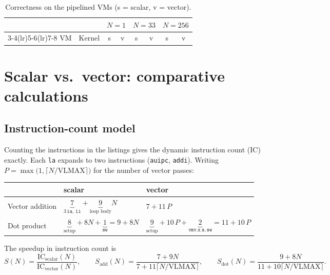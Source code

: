 \documentclass[11pt,a4paper]{article}
\newcommand{\code}[1]{\texttt{#1}}
\begin{document}
\begin{table}[H]
\centering\small
\caption{Correctness on the pipelined VMs (s = scalar, v = vector).}
\label{tab:pipe}
\begin{tabular}{llcccccc}
\toprule
& & \multicolumn{2}{c}{$N=1$} & \multicolumn{2}{c}{$N=33$} & \multicolumn{2}{c}{$N=256$} \\
\cmidrule(lr){3-4}\cmidrule(lr){5-6}\cmidrule(lr){7-8}
VM & Kernel & s & v & s & v & s & v \\
\midrule

\bottomrule
\end{tabular}
\end{table}

\section{Scalar vs.\ vector: comparative calculations}\label{sec:model}

\subsection{Instruction-count model}

Counting the instructions in the listings gives the dynamic instruction count (IC) exactly. Each
\code{la} expands to two instructions (\code{auipc}, \code{addi}). Writing
$P = \max\!\big(1, \lceil N/\mathrm{VLMAX} \rceil\big)$ for the number of vector passes:

\begin{center}
\begin{tabular}{lll}
\toprule
& scalar & vector \\
\midrule
Vector addition &
  $\underbrace{7}_{3\,\texttt{la},\ \texttt{li}} + \underbrace{9}_{\text{loop body}} N$ &
  $7 + 11\,P$ \\[10pt]
Dot product &
  $\underbrace{8}_{\text{setup}} + 8N + \underbrace{1}_{\texttt{sw}} = 9 + 8N$ &
  $\underbrace{9}_{\text{setup}} + 10\,P + \underbrace{2}_{\texttt{vmv.x.s},\,\texttt{sw}} = 11 + 10\,P$ \\
\bottomrule
\end{tabular}
\end{center}

The speedup in instruction count is
\[
  S(N) = \frac{\mathrm{IC}_{\text{scalar}}(N)}{\mathrm{IC}_{\text{vector}}(N)},
  \qquad
  S_{\text{add}}(N) = \frac{7 + 9N}{7 + 11\lceil N/\mathrm{VLMAX}\rceil},
  \qquad
  S_{\text{dot}}(N) = \frac{9 + 8N}{11 + 10\lceil N/\mathrm{VLMAX}\rceil}.
\]
\end{document}
